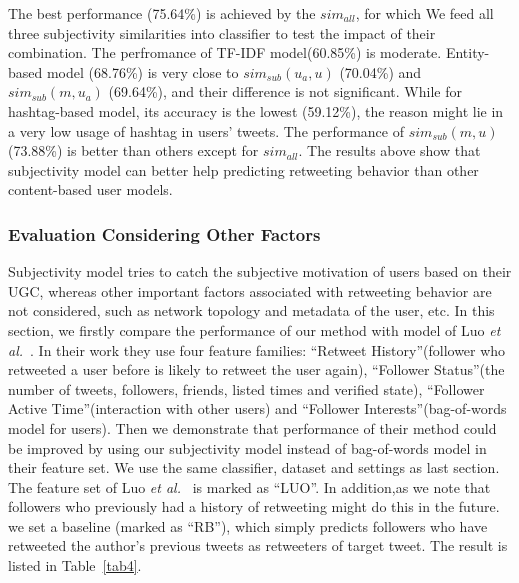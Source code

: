 \documentclass[letterpaper]{article}
\begin{document}
The best performance (75.64\%) is achieved by the $ sim_{all}  $, for which We feed all three subjectivity similarities into classifier to test the impact of their combination.
The perfromance of TF-IDF model(60.85\%) is moderate.  
Entity-based model (68.76\%) is very close to  $ sim_{sub}\left( u_{a},u \right)$ (70.04\%) and $ sim_{sub}\left( m,u_{a} \right)  $ (69.64\%), and their difference is not significant.
While for hashtag-based model, its accuracy is the lowest (59.12\%), the reason might lie in a very low usage of hashtag in users' tweets. 
The performance of $ sim_{sub} \left( m,u \right) $(73.88\%) is better than others except for $ sim_{all}  $.
The results above show that subjectivity model can better help predicting retweeting behavior than other content-based user models.

\subsubsection{Evaluation Considering Other Factors}
\label{combining}
Subjectivity model tries to catch the subjective motivation of users based on their UGC, whereas other important factors associated with retweeting behavior are not considered, such as network topology and metadata of the user, etc. 
In this section, we firstly compare the performance of our method with model of Luo \emph{et al.}~.
In their work they use four feature families: ``Retweet History''(follower who retweeted a user before is likely to retweet the user again), ``Follower Status''(the number of tweets, followers, friends, listed times and verified state), ``Follower Active Time''(interaction with other users) and ``Follower Interests''(bag-of-words model for users).
Then we demonstrate that performance of their method could be improved by using our subjectivity model instead of bag-of-words model in their feature set. 
We use the same classifier, dataset and settings as last section. The feature set of Luo \emph{et al.}~ is marked as ``LUO''.
In addition,as we note that followers who previously had a history of retweeting might do this in the future. we set a baseline (marked as ``RB''), which simply predicts followers who have retweeted the author's previous tweets as retweeters of target tweet. 
The result is listed in Table~\ref{tab4}.
\end{document}
